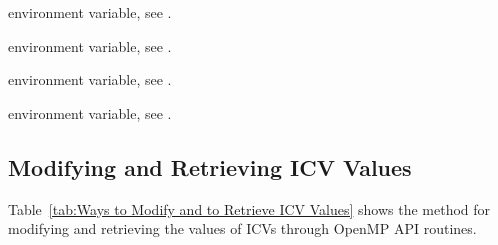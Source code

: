 \begin{crossrefs}
\item {} environment variable, see .

\item {} environment variable, see .

\item {} environment variable, see .

\item {} environment variable, see .
\end{crossrefs}



\subsection{Modifying and Retrieving ICV Values}
\label{subsec:Modifying and Retrieving ICV Values}
Table~\ref{tab:Ways to Modify and to Retrieve ICV Values} shows the method 
for modifying and retrieving the values of ICVs through OpenMP API routines.


